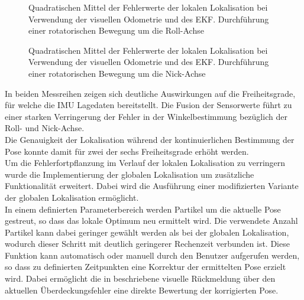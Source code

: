 
\begin{figure}

\caption{Quadratischen Mittel der Fehlerwerte der lokalen Lokalisation bei Verwendung der visuellen Odometrie und des EKF. Durchführung einer rotatorischen Bewegung um die Roll-Achse}
\label{fig.loc_loc_rot_ekf_roll}
\end{figure}

\begin{figure}

\caption{Quadratischen Mittel der Fehlerwerte der lokalen Lokalisation bei Verwendung der visuellen Odometrie und des EKF. Durchführung einer rotatorischen Bewegung um die Nick-Achse}
\label{fig.loc_loc_rot_ekf_pitch}
\end{figure}


In beiden Messreihen zeigen sich deutliche Auswirkungen auf die Freiheitsgrade, für welche die IMU Lagedaten bereitstellt. Die Fusion der Sensorwerte führt zu einer starken Verringerung der Fehler in der Winkelbestimmung bezüglich der Roll- und Nick-Achse.\\
Die Genauigkeit der Lokalisation während der kontinuierlichen Bestimmung der Pose konnte damit für zwei der sechs Freiheitsgrade erhöht werden.\\

Um die Fehlerfortpflanzung im Verlauf der lokalen Lokalisation zu verringern wurde die Implementierung der globalen Lokalisation um zusätzliche Funktionalität erweitert. Dabei wird die Ausführung einer modifizierten Variante der globalen Lokalisation ermöglicht.\\
In einem definierten Parameterbereich werden Partikel um die aktuelle Pose gestreut, so dass das lokale Optimum neu ermittelt wird. Die verwendete Anzahl Partikel kann dabei geringer gewählt werden als bei der globalen Lokalisation, wodurch dieser Schritt mit deutlich geringerer Rechenzeit verbunden ist. Diese Funktion kann automatisch oder manuell durch den Benutzer aufgerufen werden, so dass zu definierten Zeitpunkten eine Korrektur der ermittelten Pose erzielt wird. Dabei ermöglicht die in  beschriebene visuelle Rückmeldung über den aktuellen Überdeckungsfehler eine direkte Bewertung der korrigierten Pose.

